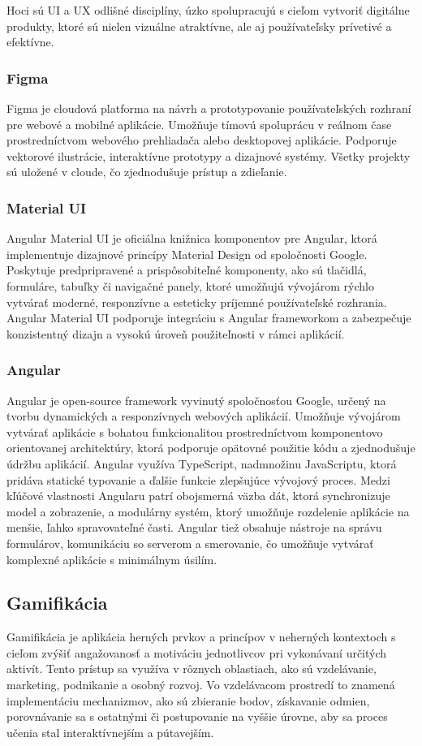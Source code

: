 Hoci sú UI a UX odlišné disciplíny, úzko spolupracujú s cieľom vytvoriť digitálne produkty, ktoré sú nielen vizuálne atraktívne, ale aj používateľsky prívetivé a efektívne.\cite{uiux}
\subsubsection{Figma}
Figma je cloudová platforma na návrh a prototypovanie používateľských rozhraní pre webové a mobilné aplikácie. 
Umožňuje tímovú spoluprácu v reálnom čase prostredníctvom webového prehliadača alebo desktopovej aplikácie. Podporuje vektorové ilustrácie, interaktívne prototypy a dizajnové systémy.
 Všetky projekty sú uložené v cloude, čo zjednodušuje prístup a zdieľanie. \cite{figma}
 \subsubsection{Material UI}
 Angular Material UI je oficiálna knižnica komponentov pre Angular, ktorá implementuje dizajnové princípy Material Design od spoločnosti Google. 
 Poskytuje predpripravené a prispôsobiteľné komponenty, ako sú tlačidlá, formuláre, tabuľky či navigačné panely, ktoré umožňujú vývojárom rýchlo vytvárať moderné, responzívne a esteticky príjemné používateľské rozhrania.
  Angular Material UI podporuje integráciu s Angular frameworkom a zabezpečuje konzistentný dizajn a vysokú úroveň použiteľnosti v rámci aplikácií. \cite{materialUI}
 \subsubsection{Angular}
 Angular je open-source framework vyvinutý spoločnosťou Google, určený na tvorbu dynamických a responzívnych webových aplikácií.
  Umožňuje vývojárom vytvárať aplikácie s bohatou funkcionalitou prostredníctvom komponentovo orientovanej architektúry, ktorá podporuje opätovné použitie kódu a zjednodušuje údržbu aplikácií.
   Angular využíva TypeScript, nadmnožinu JavaScriptu, ktorá pridáva statické typovanie a ďalšie funkcie zlepšujúce vývojový proces. 
   Medzi kľúčové vlastnosti Angularu patrí obojsmerná väzba dát, ktorá synchronizuje model a zobrazenie, a modulárny systém, ktorý umožňuje rozdelenie aplikácie na menšie, ľahko spravovateľné časti.
  Angular tiež obsahuje nástroje na správu formulárov, komunikáciu so serverom a smerovanie, čo umožňuje vytvárať komplexné aplikácie s minimálnym úsilím. \cite{angular}

\subsection{Gamifikácia}
Gamifikácia je aplikácia herných prvkov a princípov v neherných kontextoch s cieľom zvýšiť angažovanosť a motiváciu jednotlivcov pri vykonávaní určitých aktivít.
 Tento prístup sa využíva v rôznych oblastiach, ako sú vzdelávanie, marketing, podnikanie a osobný rozvoj.
Vo vzdelávacom prostredí to znamená implementáciu mechanizmov, ako sú zbieranie bodov, získavanie odmien, porovnávanie sa s ostatnými či postupovanie na vyššie úrovne, aby sa proces učenia stal interaktívnejším a pútavejším. 
